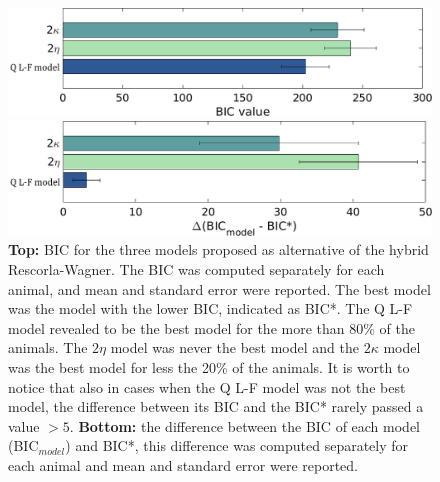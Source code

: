 \begin{figure}
    \centering
    \includegraphics[scale=0.45]{figures/BIC_Value.png}
    
    \vspace{1cm}
    
    \includegraphics[scale=0.45]{figures/DeltaBIC.png}
    \caption{\textbf{Top:} BIC for the three models proposed as alternative of the hybrid Rescorla-Wagner. The BIC was computed separately for each animal, and mean and standard error were reported. The best model was the model with the lower BIC, indicated as BIC*. The Q L-F model revealed to be the best model for the more than 80$\%$ of the animals. The $2\eta$ model was never the best model and the $2\kappa$ model was the best model for less the 20$\%$ of the animals. It is worth to notice that also in cases when the Q L-F model was not the best model, the difference between its BIC and the BIC* rarely passed a value $>5$. \textbf{Bottom:} the difference between the BIC of each model (BIC$_{model}$) and BIC*, this difference was computed separately for each animal and mean and standard error were reported.}
    \label{fig:BIC}
\end{figure}
